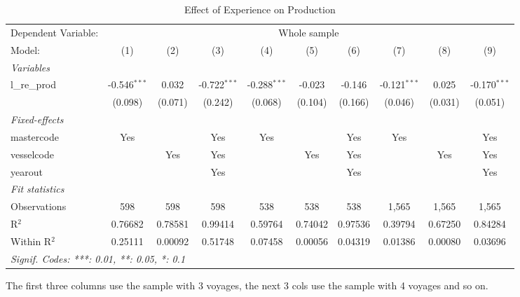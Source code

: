 
\begin{table}[htbp]
   \caption{\label{tab:n_voyage} Effect of Experience on Production}
   \centering
   \begin{tabular}{lccccccccc}
      \tabularnewline \midrule \midrule
      Dependent Variable: & \multicolumn{9}{c}{Whole sample }\\
      Model:        & (1)            & (2)     & (3)            & (4)            & (5)     & (6)     & (7)            & (8)     & (9)\\  
      \midrule
      \emph{Variables}\\
      l\_re\_prod   & -0.546$^{***}$ & 0.032   & -0.722$^{***}$ & -0.288$^{***}$ & -0.023  & -0.146  & -0.121$^{***}$ & 0.025   & -0.170$^{***}$\\   
                    & (0.098)        & (0.071) & (0.242)        & (0.068)        & (0.104) & (0.166) & (0.046)        & (0.031) & (0.051)\\   
      \midrule
      \emph{Fixed-effects}\\
      mastercode    & Yes            &         & Yes            & Yes            &         & Yes     & Yes            &         & Yes\\  
      vesselcode    &                & Yes     & Yes            &                & Yes     & Yes     &                & Yes     & Yes\\  
      yearout       &                &         & Yes            &                &         & Yes     &                &         & Yes\\  
      \midrule
      \emph{Fit statistics}\\
      Observations  & 598            & 598     & 598            & 538            & 538     & 538     & 1,565          & 1,565   & 1,565\\  
      R$^2$         & 0.76682        & 0.78581 & 0.99414        & 0.59764        & 0.74042 & 0.97536 & 0.39794        & 0.67250 & 0.84284\\  
      Within R$^2$  & 0.25111        & 0.00092 & 0.51748        & 0.07458        & 0.00056 & 0.04319 & 0.01386        & 0.00080 & 0.03696\\  
      \midrule \midrule
      \multicolumn{10}{l}{\emph{Signif. Codes: ***: 0.01, **: 0.05, *: 0.1}}\\
   \end{tabular}
   
   \par \raggedright 
   The first three columns use the sample with 3 voyages, the next 3 cols use the sample with 4 voyages and so on. 
\end{table}



